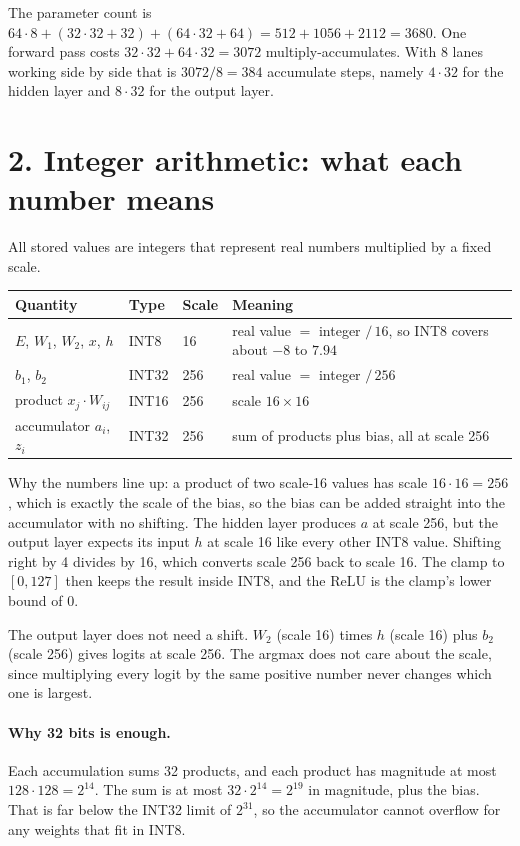\documentclass[10pt,a4paper]{article}
\begin{document}
The parameter count is $64\cdot 8 + (32\cdot 32+32) + (64\cdot 32+64) = 512+1056+2112 = 3680$. One forward pass costs $32\cdot 32 + 64\cdot 32 = 3072$ multiply-accumulates. With 8 lanes working side by side that is $3072/8 = 384$ accumulate steps, namely $4\cdot 32$ for the hidden layer and $8\cdot 32$ for the output layer.

\section*{2. Integer arithmetic: what each number means}

All stored values are integers that represent real numbers multiplied by a fixed scale.

\begin{center}
\begin{tabular}{@{}lllp{6.2cm}@{}}
\toprule
\textbf{Quantity} & \textbf{Type} & \textbf{Scale} & \textbf{Meaning} \\
\midrule
$E$, $W_1$, $W_2$, $x$, $h$ & INT8 & 16 & real value $=$ integer $/\,16$, so INT8 covers about $-8$ to $7.94$ \\
$b_1$, $b_2$ & INT32 & 256 & real value $=$ integer $/\,256$ \\
product $x_j\cdot W_{ij}$ & INT16 & 256 & scale $16\times 16$ \\
accumulator $a_i$, $z_i$ & INT32 & 256 & sum of products plus bias, all at scale 256 \\
\bottomrule
\end{tabular}
\end{center}

Why the numbers line up: a product of two scale-16 values has scale $16\cdot 16=256$, which is exactly the scale of the bias, so the bias can be added straight into the accumulator with no shifting.
The hidden layer produces $a$ at scale 256, but the output layer expects its input $h$ at scale 16 like every other INT8 value. Shifting right by 4 divides by 16, which converts scale 256 back to scale 16. The clamp to $[0,127]$ then keeps the result inside INT8, and the ReLU is the clamp's lower bound of 0.

The output layer does not need a shift. $W_2$ (scale 16) times $h$ (scale 16) plus $b_2$ (scale 256) gives logits at scale 256. The argmax does not care about the scale, since multiplying every logit by the same positive number never changes which one is largest.

\paragraph{Why 32 bits is enough.} Each accumulation sums 32 products, and each product has magnitude at most $128\cdot 128=2^{14}$. The sum is at most $32\cdot 2^{14}=2^{19}$ in magnitude, plus the bias. That is far below the INT32 limit of $2^{31}$, so the accumulator cannot overflow for any weights that fit in INT8.
\end{document}

